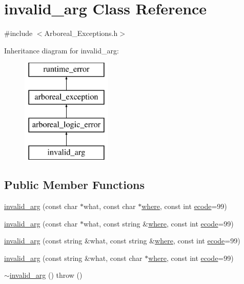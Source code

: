 \hypertarget{classinvalid__arg}{}\section{invalid\+\_\+arg Class Reference}
\label{classinvalid__arg}


{\ttfamily \#include $<$Arboreal\+\_\+\+Exceptions.\+h$>$}

Inheritance diagram for invalid\+\_\+arg\+:\begin{figure}[H]
\begin{center}
\leavevmode
\includegraphics[height=5.000000cm]{classinvalid__arg}
\end{center}
\end{figure}
\subsection*{Public Member Functions}
\begin{DoxyCompactItemize}
\item 
\mbox{\hyperlink{classinvalid__arg_ab470c1e208290687c57ddb80ad7c91bf}{invalid\+\_\+arg}} (const char $\ast$what, const char $\ast$\mbox{\hyperlink{classarboreal__exception_a802003dee586aaeb0b0d7ce909da2dad}{where}}, const int \mbox{\hyperlink{classarboreal__exception_a318e716601c544d92ff9af25edebd725}{ecode}}=99)
\item 
\mbox{\hyperlink{classinvalid__arg_ac64346933956c640dc48166d3c11ea6d}{invalid\+\_\+arg}} (const char $\ast$what, const string \&\mbox{\hyperlink{classarboreal__exception_a802003dee586aaeb0b0d7ce909da2dad}{where}}, const int \mbox{\hyperlink{classarboreal__exception_a318e716601c544d92ff9af25edebd725}{ecode}}=99)
\item 
\mbox{\hyperlink{classinvalid__arg_afd1c07ada97de63dd8b2bf8d19753649}{invalid\+\_\+arg}} (const string \&what, const string \&\mbox{\hyperlink{classarboreal__exception_a802003dee586aaeb0b0d7ce909da2dad}{where}}, const int \mbox{\hyperlink{classarboreal__exception_a318e716601c544d92ff9af25edebd725}{ecode}}=99)
\item 
\mbox{\hyperlink{classinvalid__arg_a1b68c46a8c2ddc202eb89edf05667618}{invalid\+\_\+arg}} (const string \&what, const char $\ast$\mbox{\hyperlink{classarboreal__exception_a802003dee586aaeb0b0d7ce909da2dad}{where}}, const int \mbox{\hyperlink{classarboreal__exception_a318e716601c544d92ff9af25edebd725}{ecode}}=99)
\item 
\mbox{\hyperlink{classinvalid__arg_ac45ee5e85c700baa425fd431e350e938}{$\sim$invalid\+\_\+arg}} ()  throw ()
\end{DoxyCompactItemize}

